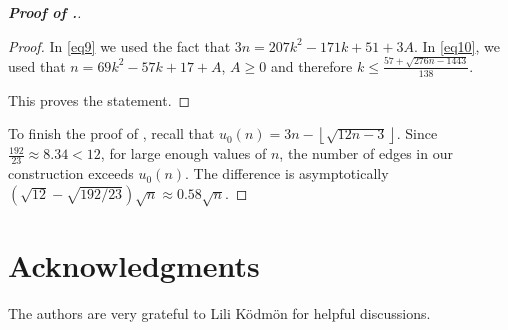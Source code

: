 \documentclass[10pt]{article}
\theoremstyle{definition}
\begin{document}
\begin{proof}[\bf Proof of .]
\begin{proof}
In \eqref{eq9} we used the fact that $3n=207k^2-171k+51+3A$. In \eqref{eq10}, we used that $n=69k^2-57k+17+A$, $A \geq 0$ and therefore
$k \leq \frac{57 + \sqrt{276n - 1443}}{138}.$

This proves the statement.
\end{proof}

To finish the proof of , recall that $u_0(n) = 3n-\left\lfloor\sqrt{12n - 3}\right\rfloor$. Since $\frac{192}{23} \approx 8.34 < 12$, for large enough values of $n$, the number of edges in our construction exceeds $u_0(n)$. The difference is asymptotically $\left(\sqrt{12} - \sqrt{192/23}\right)\sqrt{n} \approx 0.58\sqrt{n}$.
\end{proof}

\bigskip
\section*{Acknowledgments}

The authors are very grateful to Lili K\"{o}dm\"{o}n for helpful discussions.
\end{document}
